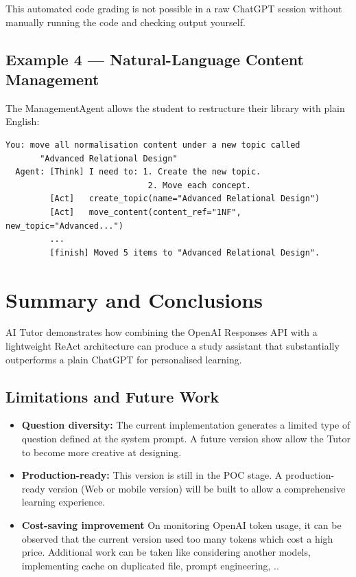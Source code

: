\documentclass[12pt,a4paper]{article}
\begin{document}
This automated code grading is not possible in a raw ChatGPT session without
manually running the code and checking output yourself.

\subsection{Example 4 --- Natural-Language Content Management}

The ManagementAgent allows the student to restructure their library with
plain English:

\begin{lstlisting}[language={},numbers=none]
  You: move all normalisation content under a new topic called
       "Advanced Relational Design"
  Agent: [Think] I need to: 1. Create the new topic.
                             2. Move each concept.
         [Act]   create_topic(name="Advanced Relational Design")
         [Act]   move_content(content_ref="1NF", new_topic="Advanced...")
         ...
         [finish] Moved 5 items to "Advanced Relational Design".
\end{lstlisting}

\section{Summary and Conclusions}

AI Tutor demonstrates how combining the OpenAI Responses API with a
lightweight ReAct architecture can produce a study assistant that
substantially outperforms a plain ChatGPT for personalised learning.

\subsection{Limitations and Future Work}

\begin{itemize}[leftmargin=*]
  \item \textbf{Question diversity:} The current implementation generates
        a limited type of question defined at the system prompt.
        A future version show allow the Tutor to become more creative at designing.
  \item \textbf{Production-ready:} This version is still in the POC stage. A production-ready
        version (Web or mobile version) will be built to allow a comprehensive learning experience.
  \item \textbf{Cost-saving improvement} On monitoring OpenAI token usage, it can be observed that
        the current version used too many tokens which cost a high price. Additional work can be taken like
        considering another models, implementing cache on duplicated file, prompt engineering, ..

\end{itemize}
\end{document}
